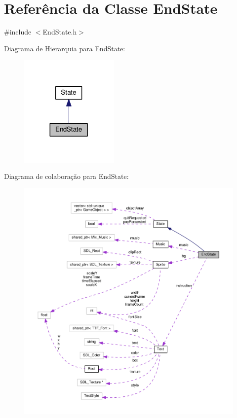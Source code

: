\hypertarget{classEndState}{\section{Referência da Classe End\+State}
\label{classEndState}
}


{\ttfamily \#include $<$End\+State.\+h$>$}



Diagrama de Hierarquia para End\+State\+:\nopagebreak
\begin{figure}[H]
\begin{center}
\leavevmode
\includegraphics[width=137pt]{classEndState__inherit__graph}
\end{center}
\end{figure}


Diagrama de colaboração para End\+State\+:\nopagebreak
\begin{figure}[H]
\begin{center}
\leavevmode
\includegraphics[width=350pt]{classEndState__coll__graph}
\end{center}
\end{figure}
